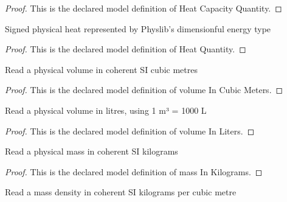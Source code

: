 \begin{proof}
  This is the declared model definition of Heat Capacity Quantity.
\end{proof}
\begin{definition}
  \label{def:physics:phyx-mini-0455:phyxminiproblems-problemphyxmini0455-heatquantity}
  Signed physical heat represented by Physlib's dimensionful energy type
\end{definition}
\begin{proof}
  This is the declared model definition of Heat Quantity.
\end{proof}
\begin{definition}
  \label{def:physics:phyx-mini-0455:phyxminiproblems-problemphyxmini0455-volumeincubicmeters}
  Read a physical volume in coherent SI cubic metres
\end{definition}
\begin{proof}
  This is the declared model definition of volume In Cubic Meters.
\end{proof}
\begin{definition}
  \label{def:physics:phyx-mini-0455:phyxminiproblems-problemphyxmini0455-volumeinliters}
  Read a physical volume in litres, using 1 m³ = 1000 L
\end{definition}
\begin{proof}
  This is the declared model definition of volume In Liters.
\end{proof}
\begin{definition}
  \label{def:physics:phyx-mini-0455:phyxminiproblems-problemphyxmini0455-massinkilograms}
  Read a physical mass in coherent SI kilograms
\end{definition}
\begin{proof}
  This is the declared model definition of mass In Kilograms.
\end{proof}
\begin{definition}
  \label{def:physics:phyx-mini-0455:phyxminiproblems-problemphyxmini0455-densityinkilogramspercubicmeter}
  Read a mass density in coherent SI kilograms per cubic metre
\end{definition}
